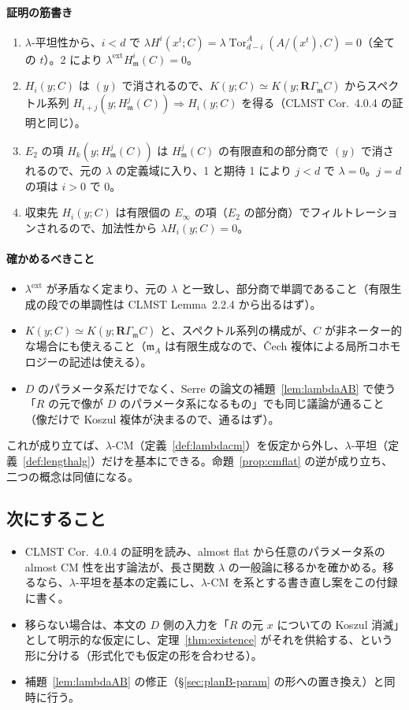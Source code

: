 \documentclass[11pt,a4paper]{ltjsarticle}
\numberwithin{equation}{section}
\theoremstyle{plain}
\theoremstyle{definition}
\theoremstyle{definition}
\newcommand{\m}{\mathfrak{m}}
\newcommand{\Tor}{\operatorname{Tor}}
\begin{document}
\paragraph{証明の筋書き}
\begin{enumerate}
  \item $\lambda$-平坦性から、$i<d$ で $\lambda H^i(x^t;C) = \lambda\Tor^A_{d-i}(A/(x^t),C) = 0$（全ての $t$）。2 により $\lambda^{\mathrm{ext}}H^i_\m(C) = 0$。
  \item $H_i(y;C)$ は $(y)$ で消されるので、$K(y;C)\simeq K(y;\mathbf{R}\Gamma_\m C)$ からスペクトル系列 $H_{i+j}(y;H^j_\m(C))\Rightarrow H_i(y;C)$ を得る（CLMST Cor.~4.0.4 の証明と同じ）。
  \item $E_2$ の項 $H_k(y;H^j_\m(C))$ は $H^j_\m(C)$ の有限直和の部分商で $(y)$ で消されるので、元の $\lambda$ の定義域に入り、1 と期待 1 により $j<d$ で $\lambda = 0$。$j = d$ の項は $i>0$ で $0$。
  \item 収束先 $H_i(y;C)$ は有限個の $E_\infty$ の項（$E_2$ の部分商）でフィルトレーションされるので、加法性から $\lambda H_i(y;C) = 0$。
\end{enumerate}

\paragraph{確かめるべきこと}
\begin{itemize}
  \item $\lambda^{\mathrm{ext}}$ が矛盾なく定まり、元の $\lambda$ と一致し、部分商で単調であること（有限生成の段での単調性は CLMST Lemma~2.2.4 から出るはず）。
  \item $K(y;C)\simeq K(y;\mathbf{R}\Gamma_\m C)$ と、スペクトル系列の構成が、$C$ が非ネーター的な場合にも使えること（$\m_A$ は有限生成なので、Čech 複体による局所コホモロジーの記述は使える）。
  \item $D$ のパラメータ系だけでなく、Serre の論文の補題~\ref{lem:lambdaAB} で使う「$R$ の元で像が $D$ のパラメータ系になるもの」でも同じ議論が通ること（像だけで Koszul 複体が決まるので、通るはず）。
\end{itemize}
これが成り立てば、$\lambda$-CM（定義~\ref{def:lambdacm}）を仮定から外し、$\lambda$-平坦（定義~\ref{def:lengthalg}）だけを基本にできる。命題~\ref{prop:cmflat} の逆が成り立ち、二つの概念は同値になる。

\subsection{次にすること}
\begin{itemize}
  \item CLMST Cor.~4.0.4 の証明を読み、almost flat から任意のパラメータ系の almost CM 性を出す論法が、長さ関数 $\lambda$ の一般論に移るかを確かめる。移るなら、$\lambda$-平坦を基本の定義にし、$\lambda$-CM を系とする書き直し案をこの付録に書く。
  \item 移らない場合は、本文の $D$ 側の入力を「$R$ の元 $x$ についての Koszul 消滅」として明示的な仮定にし、定理~\ref{thm:existence} がそれを供給する、という形に分ける（形式化でも仮定の形を合わせる）。
  \item 補題~\ref{lem:lambdaAB} の修正（\S\ref{sec:planB-param} の形への置き換え）と同時に行う。
\end{itemize}
\end{document}
